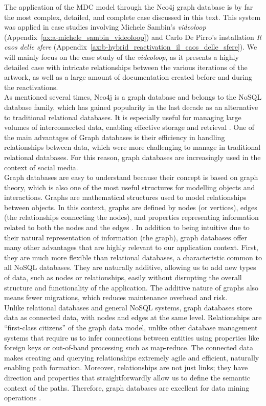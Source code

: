 The application of the MDC model through the Neo4j graph database is by far the most complex, detailed, and complete case discussed in this text. This system was applied in case studies involving Michele Sambin’s \textit{videoloop} (Appendix~\ref{ax:a-michele_sambin_videoloop}) and Carlo De Pirro’s installation \textit{Il caos delle sfere} (Appendix~\ref{ax:b-hybrid_reactivation_il_caos_delle_sfere}). We will mainly focus on the case study of the \textit{videoloop}, as it presents a highly detailed case with intricate relationships between the various iterations of the artwork, as well as a large amount of documentation created before and during the reactivations.\\
As mentioned several times, Neo4j is a graph database and belongs to the NoSQL database family, which has gained popularity in the last decade as an alternative to traditional relational databases. It is especially useful for managing large volumes of interconnected data, enabling effective storage and retrieval \cite{lourencco2015choosing}. One of the main advantages of Graph databases is their efficiency in handling relationships between data, which were more challenging to manage in traditional relational databases. For this reason, graph databases are increasingly used in the context of social media.\\
Graph databases are easy to understand because their concept is based on graph theory, which is also one of the most useful structures for modelling objects and interactions. Graphs are mathematical structures used to model relationships between objects. In this context, graphs are defined by nodes (or vertices), edges (the relationships connecting the nodes), and properties representing information related to both the nodes and the edges \cite{guia2017graph}. In addition to being intuitive due to their natural representation of information (the graph), graph databases offer many other advantages that are highly relevant to our application context. First, they are much more flexible than relational databases, a characteristic common to all NoSQL databases. They are naturally additive, allowing us to add new types of data, such as nodes or relationships, easily without disrupting the overall structure and functionality of the application. The additive nature of graphs also means fewer migrations, which reduces maintenance overhead and risk.\\
Unlike relational databases and general NoSQL systems, graph databases store data as connected data, with nodes and edges at the same level. Relationships are ``first-class citizens'' of the graph data model, unlike other database management systems that require us to infer connections between entities using properties like foreign keys or out-of-band processing such as map-reduce. The connected data makes creating and querying relationships extremely agile and efficient, naturally enabling path formation. Moreover, relationships are not just links; they have direction and properties that straightforwardly allow us to define the semantic context of the paths. Therefore, graph databases are excellent for data mining operations \cite{robinson2013graph}.\\
